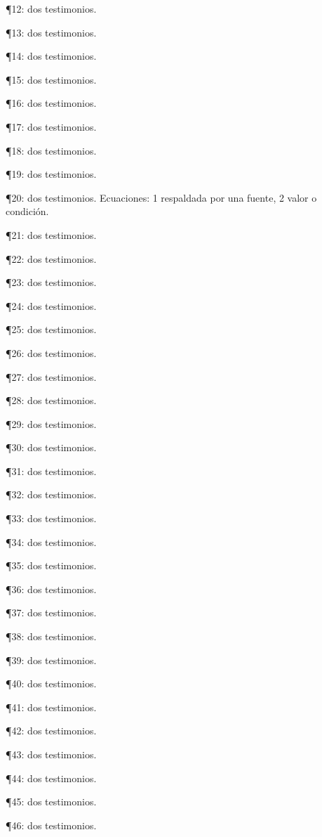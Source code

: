 \documentclass{book}
\begin{document}
\noindent ¶12: dos testimonios.

\noindent ¶13: dos testimonios.

\noindent ¶14: dos testimonios.

\noindent ¶15: dos testimonios.

\noindent ¶16: dos testimonios.

\noindent ¶17: dos testimonios.

\noindent ¶18: dos testimonios.

\noindent ¶19: dos testimonios.

\noindent ¶20: dos testimonios. Ecuaciones: 1 respaldada por una fuente, 2 valor o condición.

\noindent ¶21: dos testimonios.

\noindent ¶22: dos testimonios.

\noindent ¶23: dos testimonios.

\noindent ¶24: dos testimonios.

\noindent ¶25: dos testimonios.

\noindent ¶26: dos testimonios.

\noindent ¶27: dos testimonios.

\noindent ¶28: dos testimonios.

\noindent ¶29: dos testimonios.

\noindent ¶30: dos testimonios.

\noindent ¶31: dos testimonios.

\noindent ¶32: dos testimonios.

\noindent ¶33: dos testimonios.

\noindent ¶34: dos testimonios.

\noindent ¶35: dos testimonios.

\noindent ¶36: dos testimonios.

\noindent ¶37: dos testimonios.

\noindent ¶38: dos testimonios.

\noindent ¶39: dos testimonios.

\noindent ¶40: dos testimonios.

\noindent ¶41: dos testimonios.

\noindent ¶42: dos testimonios.

\noindent ¶43: dos testimonios.

\noindent ¶44: dos testimonios.

\noindent ¶45: dos testimonios.

\noindent ¶46: dos testimonios.
\end{document}
